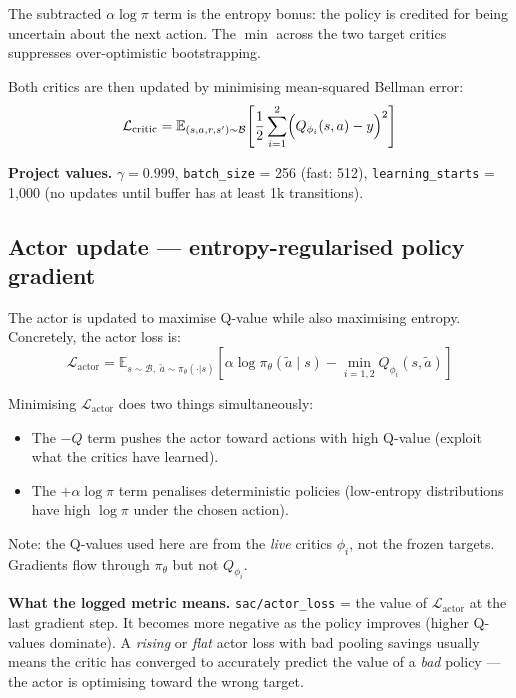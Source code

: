 \documentclass[11pt]{article}
\begin{document}
The subtracted $\alpha \log \pi$ term is the entropy bonus: the policy is
credited for being uncertain about the next action.  The $\min$ across the two
target critics suppresses over-optimistic bootstrapping.

Both critics are then updated by minimising mean-squared Bellman error:
\begin{equation}
  \mathcal{L}_{\text{critic}}
  = \mathbb{E}_{(s,a,r,s') \sim \mathcal{B}}
    \!\left[
      \frac{1}{2}\sum_{i=1}^{2}
      \Bigl(Q_{\phi_i}(s,a) - y\Bigr)^2
    \right]
  \label{eq:critic_loss}
\end{equation}

\noindent\textbf{Project values.} $\gamma = 0.999$, \texttt{batch\_size} = 256 (fast: 512),
\texttt{learning\_starts} = 1{,}000 (no updates until buffer has at least 1k transitions).

\subsection*{Actor update --- entropy-regularised policy gradient}

The actor is updated to maximise Q-value while also maximising entropy.
Concretely, the actor loss is:
\begin{equation}
  \mathcal{L}_{\text{actor}}
  = \mathbb{E}_{s \sim \mathcal{B},\; \tilde{a} \sim \pi_\theta(\cdot|s)}
    \!\left[
      \alpha \log \pi_\theta(\tilde{a} \mid s)
      - \min_{i=1,2} Q_{\phi_i}(s, \tilde{a})
    \right]
  \label{eq:actor_loss}
\end{equation}

Minimising $\mathcal{L}_{\text{actor}}$ does two things simultaneously:
\begin{itemize}
  \item The $-Q$ term pushes the actor toward actions with high Q-value
        (exploit what the critics have learned).
  \item The $+\alpha \log \pi$ term penalises deterministic policies
        (low-entropy distributions have high $\log \pi$ under the chosen action).
\end{itemize}

Note: the Q-values used here are from the \emph{live} critics $\phi_i$,
not the frozen targets.  Gradients flow through $\pi_\theta$ but not $Q_{\phi_i}$.

\noindent\textbf{What the logged metric means.}
\texttt{sac/actor\_loss} = the value of $\mathcal{L}_{\text{actor}}$ at the last
gradient step.  It becomes more negative as the policy improves
(higher Q-values dominate).  A \emph{rising} or \emph{flat} actor loss with bad
pooling savings usually means the critic has converged to accurately predict the
value of a \emph{bad} policy --- the actor is optimising toward the wrong target.
\end{document}
